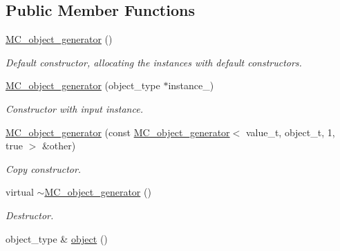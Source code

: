 \subsection*{Public Member Functions}
\begin{DoxyCompactItemize}
\item 
\hypertarget{a00366_a979125fb3e1bc83ea6b7cc0c56a3e11e}{\hyperlink{a00366_a979125fb3e1bc83ea6b7cc0c56a3e11e}{M\-C\-\_\-object\-\_\-generator} ()}\label{a00366_a979125fb3e1bc83ea6b7cc0c56a3e11e}

\begin{DoxyCompactList}\small\item\em Default constructor, allocating the instances with default constructors. \end{DoxyCompactList}\item 
\hypertarget{a00366_a4e834a32979ebba3735737265f823893}{\hyperlink{a00366_a4e834a32979ebba3735737265f823893}{M\-C\-\_\-object\-\_\-generator} (object\-\_\-type $\ast$instance\-\_\-)}\label{a00366_a4e834a32979ebba3735737265f823893}

\begin{DoxyCompactList}\small\item\em Constructor with input instance. \end{DoxyCompactList}\item 
\hypertarget{a00366_aa49901b0ec4499a8ba87ba1dd0e7c4d9}{\hyperlink{a00366_aa49901b0ec4499a8ba87ba1dd0e7c4d9}{M\-C\-\_\-object\-\_\-generator} (const \hyperlink{a00364}{M\-C\-\_\-object\-\_\-generator}$<$ value\-\_\-t, object\-\_\-t, 1, true $>$ \&other)}\label{a00366_aa49901b0ec4499a8ba87ba1dd0e7c4d9}

\begin{DoxyCompactList}\small\item\em Copy constructor. \end{DoxyCompactList}\item 
\hypertarget{a00366_a186032ec6bde9d10cc7edd8a053a0baf}{virtual \hyperlink{a00366_a186032ec6bde9d10cc7edd8a053a0baf}{$\sim$\-M\-C\-\_\-object\-\_\-generator} ()}\label{a00366_a186032ec6bde9d10cc7edd8a053a0baf}

\begin{DoxyCompactList}\small\item\em Destructor. \end{DoxyCompactList}\item 
\hypertarget{a00366_abe72a073c2b080880bd980760c5a0294}{object\-\_\-type \& \hyperlink{a00366_abe72a073c2b080880bd980760c5a0294}{object} ()}\label{a00366_abe72a073c2b080880bd980760c5a0294}


\end{DoxyCompactItemize}
